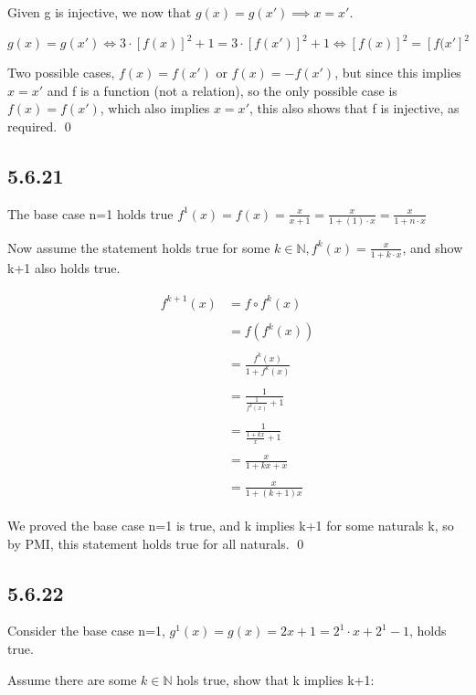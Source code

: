 \documentclass{article}
\begin{document}
Given g is injective, we now that $g(x)=g(x')\implies x=x'$.

$$g(x)=g(x')\iff 3\cdot [f(x)]^2+1=3\cdot [f(x')]^2+1 \iff [f(x)]^2=[f(x']^2$$

Two possible cases, $f(x)=f(x')$ or $f(x)=-f(x')$, but since this implies $x=x'$ and f is a function (not a relation), so the only possible case is $f(x)=f(x')$, which also implies $x=x'$, this also shows that f is injective, as required. \qed

\subsection*{5.6.21}

The base case n=1 holds true $f^1(x)=f(x)=\frac{x}{x+1}=\frac{x}{1+(1)\cdot x}=\frac{x}{1+n\cdot x}$

Now assume the statement holds true for some $k\in\mathbb{N}, f^{k}(x)=\frac{x}{1+k\cdot x}$, and show k+1 also holds true.

\begin{gather*}
    \begin{aligned}f^{k+1}(x)&=f\circ f^k(x)\\\\&=f\left(f^{k}(x)\right)\\\\&=\frac{f^{k}(x)}{1+f^{k}(x)}\\\\&=\frac{1}{\frac{1}{f^{k}(x)}+1}\\\\&=\frac{1}{\frac{1+kx}{x}+1}\\\\&=\frac{x}{1+kx+x}\\\\&=\frac{x}{1+\left(k+1\right)x}\end{aligned}
\end{gather*}

We proved the base case n=1 is true, and k implies k+1 for some naturals k, so by PMI, this statement holds true for all naturals. \qed

\subsection*{5.6.22}

Consider the base case n=1, $g^1(x)=g(x)=2x+1=2^1\cdot x + 2^1 - 1$, holds true.

Assume there are some $k\in\mathbb{N}$ hols true, show that k implies k+1:
\end{document}
